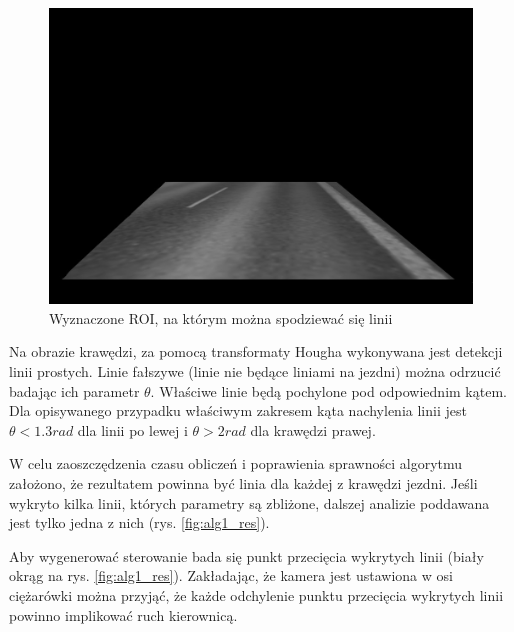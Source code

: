 \begin{figure}
  \centering
  \includegraphics[width=13cm]{img/alg1_roi.jpg}
  \caption{Wyznaczone ROI, na którym można spodziewać się linii}
  \label{fig:alg1_roi}
\end{figure}

Na obrazie krawędzi, za pomocą transformaty Hougha wykonywana jest detekcji linii prostych. 
Linie fałszywe (linie nie będące liniami na jezdni) można odrzucić badając ich parametr $\theta$. %
Właściwe linie będą pochylone pod odpowiednim kątem. 
Dla opisywanego przypadku właściwym zakresem kąta nachylenia linii jest $\theta < 1.3rad$ dla linii po lewej i $\theta > 2rad$ dla krawędzi prawej. %

W celu zaoszczędzenia czasu obliczeń i poprawienia sprawności algorytmu założono, że rezultatem powinna być linia dla każdej z krawędzi jezdni. Jeśli wykryto kilka linii, których parametry są zbliżone, dalszej analizie poddawana jest tylko jedna z nich (rys. \ref{fig:alg1_res}).

Aby wygenerować sterowanie bada się punkt przecięcia wykrytych linii (biały okrąg na rys. \ref{fig:alg1_res}). Zakładając, że kamera jest ustawiona w osi ciężarówki można przyjąć, że każde odchylenie punktu przecięcia wykrytych linii powinno implikować ruch kierownicą.

